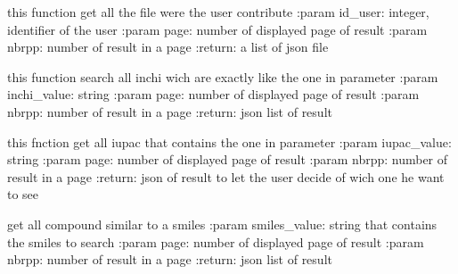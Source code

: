 \documentclass[letterpaper,10pt,english]{sphinxmanual}
\begin{document}

\begin{fulllineitems}
\label{\detokenize{QuChemPedIA:QuChemPedIA.search.search_id_user}}
this function get all the file were the user contribute
:param id\_user: integer, identifier of the user
:param page: number of displayed page of result
:param nbrpp: number of result in a page
:return: a list of json file

\end{fulllineitems}


\begin{fulllineitems}
\label{\detokenize{QuChemPedIA:QuChemPedIA.search.search_inchi}}
this function search all inchi wich are exactly like the one in parameter
:param inchi\_value: string
:param page: number of displayed page of result
:param nbrpp: number of result in a page
:return: json list of result

\end{fulllineitems}


\begin{fulllineitems}
\label{\detokenize{QuChemPedIA:QuChemPedIA.search.search_iupac}}
this fnction get all iupac that contains the one in parameter
:param iupac\_value: string
:param page: number of displayed page of result
:param nbrpp: number of result in a page
:return: json of result to let the user decide of wich one he want to see

\end{fulllineitems}


\begin{fulllineitems}
\label{\detokenize{QuChemPedIA:QuChemPedIA.search.search_smiles}}
get all compound similar to a smiles
:param smiles\_value: string that contains the smiles to search
:param page: number of displayed page of result
:param nbrpp: number of result in a page
:return: json list of result

\end{fulllineitems}
\end{document}
